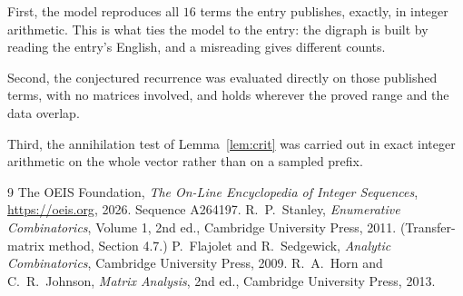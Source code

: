 \documentclass[11pt,a4paper]{article}
\theoremstyle{plain}
\theoremstyle{definition}
\begin{document}
First, the model reproduces all $16$ terms the entry publishes, exactly, in integer
arithmetic. This is what ties the model to the entry: the digraph is built by reading the
entry's English, and a misreading gives different counts.

Second, the conjectured recurrence was evaluated directly on those published terms, with no
matrices involved, and holds wherever the proved range and the data overlap.

Third, the annihilation test of Lemma~\ref{lem:crit} was carried out in exact integer
arithmetic on the whole vector rather than on a sampled prefix.

\begin{thebibliography}{9}
 The OEIS Foundation, \emph{The On-Line Encyclopedia of Integer
Sequences}, \url{https://oeis.org}, 2026. Sequence A264197.
 R.~P.~Stanley, \emph{Enumerative Combinatorics}, Volume 1, 2nd ed.,
Cambridge University Press, 2011. (Transfer-matrix method, Section 4.7.)
 P.~Flajolet and R.~Sedgewick, \emph{Analytic Combinatorics}, Cambridge
University Press, 2009.
 R.~A.~Horn and C.~R.~Johnson, \emph{Matrix Analysis}, 2nd ed., Cambridge
University Press, 2013.
\end{thebibliography}
\end{document}

